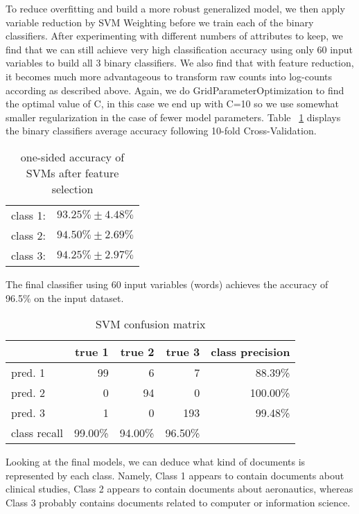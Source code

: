 \documentclass[fullpage]{article}
\begin{document}
To reduce overfitting and build a more robust generalized model, we then apply variable reduction by SVM Weighting before we train each of the binary classifiers. After experimenting with different numbers of attributes to keep, we find that we can still achieve very high classification accuracy using only 60 input variables to build all 3 binary classifiers. We also find that with feature reduction, it becomes much more advantageous to transform raw counts into log-counts according as described above. Again, we do GridParameterOptimization to find the optimal value of C, in this case we end up with C=10 so we use somewhat smaller regularization in the case of fewer model parameters.
Table ~\ref{tab:SVMfeature} displays the binary classifiers average accuracy following 10-fold Cross-Validation.
\begin{table}[h!]
\begin{center}
\begin{tabular} { l  r  }
class 1:& $93.25\%\pm 4.48\%$\\
class 2:& $94.50\%\pm 2.69\%$\\
class 3:&$ 94.25\%\pm 2.97\%$\\
\end{tabular}
\caption{one-sided accuracy of SVMs after feature selection}
\end{center}
\label{tab:SVMfeature}
\end{table}
The final classifier using 60 input variables (words) achieves the accuracy of 96.5\% on the input dataset.

\begin{table}[h!]
\begin{center}
\begin{tabular} { l | r | r | r | r |}
	    &true 1&true 2&	true 3&	class precision \\
\hline
pred. 1&	99&	     6	 &   7	   &    88.39\%\\
pred. 2&	0&	     94	   & 0	       &100.00\%\\
pred. 3&	1&	     0	   &193	     &  99.48\%\\
\hline
class recall&	99.00\%	&94.00\%	&96.50\%&	\\
\end{tabular}
\caption{SVM confusion matrix}
\end{center}
\end{table}

Looking at the final models, we can deduce what kind of documents is represented by each class. Namely, Class 1 appears to contain documents about clinical studies, Class 2 appears to contain documents about aeronautics, whereas Class 3 probably contains documents related to computer or information science.
\end{document}
